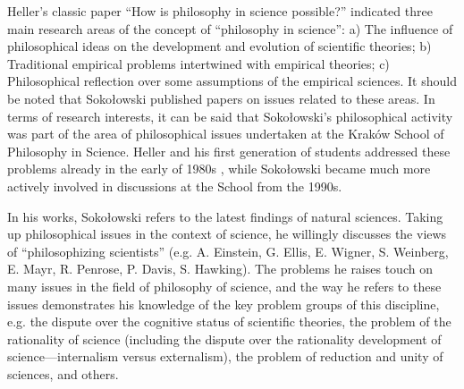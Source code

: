 Heller's classic paper ``How is philosophy in science possible?'' 
\parencites[][]{Heller1986Jak}[][]{Heller2019How} %
 indicated three main research areas of the concept of ``philosophy in science'': a) The influence of philosophical ideas on the development and evolution of scientific theories; b) Traditional empirical problems intertwined with empirical theories; c) Philosophical reflection over some assumptions of the empirical sciences. It should be noted that Sokołowski published papers on issues related to these areas. In terms of research interests, it can be said that Sokołowski's philosophical activity was part of the area of philosophical issues undertaken at the Kraków School of Philosophy in Science. Heller and his first generation of students addressed these problems already in the early of 1980s 
\parencite[][p.222]{Trombik2021Koncepcje}, %
 while Sokołowski became much more actively involved in discussions at the School from the 1990s.



In his works, Sokołowski refers to the latest findings of natural sciences. Taking up philosophical issues in the context of science, he willingly discusses the views of ``philosophizing scientists'' (e.g. A. Einstein, G. Ellis, E. Wigner, S. Weinberg, E. Mayr, R. Penrose, P. Davis, S. Hawking). The problems he raises touch on many issues in the field of philosophy of science, and the way he refers to these issues demonstrates his knowledge of the key problem groups of this discipline, e.g. the dispute over the cognitive status of scientific theories, the problem of the rationality of science (including the dispute over the rationality development of science---internalism versus externalism), the problem of reduction and unity of sciences, and others.



